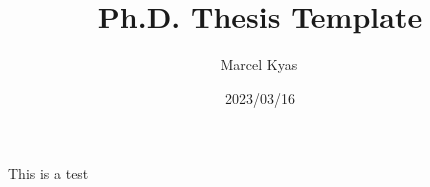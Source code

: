 \documentclass[a4paper,12pt]{ruthesis2}
\begin{document}
\title{Ph.D. Thesis Template}
\author{Marcel Kyas\,}
\date{2023/03/16}

\maketitle

This is a test
\end{document}
